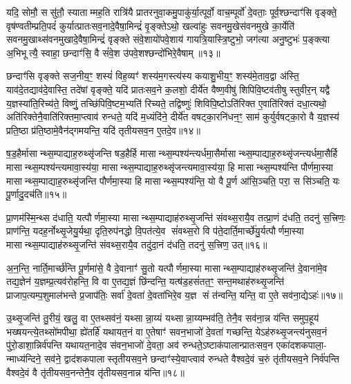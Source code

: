{\anuvakamend[{आ॒दि॒त्यस्तस्यै॒व द्वे च॑॥४॥}]}

यदि॒ सोमौ॒ ससु॑तौ॒ स्याताम्मह॒ति रात्रि॑यै प्रातरनुवा॒कमु॒पाकु॑र्या॒त्पूर्वो॒ वाच॒म्पूर्वो॑ दे॒वताः॒ पूर्व॒श्छन्दाꣳ॑सि वृङ्क्ते॒ वृष॑ण्वतीम्प्रति॒पदं॑ कुर्यात्प्रातःसव॒नादे॒वैषा॒मिन्द्रं॑ वृ॒ङ्क्तेऽथो॒ खल्वा॑हुः सवनमु॒खेस॑वनमुखे का॒र्येति॑ सवनमु॒खाथ्स॑वनमुखादे॒वैषा॒मिन्द्रं॑ वृङ्क्ते संवे॒शायो॑पवे॒शाय॑ गायत्रि॒यास्त्रि॒ष्टुभो॒ जग॑त्या अनु॒ष्टुभः॑ प॒ङ्क्त्या अ॒भिभूत्यै॒ स्वाहा॒ छन्दाꣳ॑सि॒ वै सं॑वे॒श उ॑पवे॒शश्छन्दो॑भिरे॒वैषाम्॥१३॥

छन्दाꣳ॑सि वृङ्क्ते सज॒नीय॒ꣳ॒ शस्यं॑ विह॒व्यꣳ॑ शस्य॑म॒गस्त्य॑स्य कयाशु॒भीय॒ꣳ॒ शस्य॑मे॒ताव॒द्वा अ॑स्ति॒ याव॑दे॒तद्याव॑दे॒वास्ति॒ तदे॑षां वृङ्क्ते॒ यदि॑ प्रातःसव॒ने क॒लशो॒ दीर्ये॑त वैष्ण॒वीषु॑ शिपिवि॒ष्टव॑तीषु स्तुवीर॒न् यद्वै य॒ज्ञस्या॑ति॒रिच्य॑ते॒ विष्णुं॒ तच्छि॑पिवि॒ष्टम॒भ्यति॑ रिच्यते॒ तद्विष्णुः॑ शिविपि॒ष्टोऽति॑रिक्त ए॒वाति॑रिक्तं दधा॒त्यथो॒ अति॑रिक्तेनै॒वाति॑रिक्तमा॒प्त्वाव॑ रुन्धते॒ यदि॑ म॒ध्यंदि॑ने॒ दीर्ये॑त वषट्का॒रनि॑धन॒ꣳ॒ साम॑ कुर्युर्वषट्का॒रो वै य॒ज्ञस्य॑ प्रति॒ष्ठा प्र॑ति॒ष्ठामे॒वैन॑द्गमयन्ति॒ यदि॑ तृतीयसव॒न ए॒तदे॒व॥१४॥

{\anuvakamend[{छन्दो॑भिरे॒वैषा॒मवैका॒न्नविꣳ॑श॒तिश्च॑॥५॥}]}

ष॒ड॒हैर्मासान्थ्स॒म्पाद्याह॒रुथ्सृ॑जन्ति षड॒हैर्\mbox{}हि मासान्थ्स॒म्पश्य॑न्त्यर्धमा॒सैर्मासान्थ्स॒म्पाद्याह॒रुथ्सृ॑जन्त्यर्धमा॒सैर्\mbox{}हि मासान्थ्स॒म्पश्य॑न्त्यमावा॒स्य॑या॒ मासान्थ्स॒म्पाद्याह॒रुथ्सृ॑जन्त्यमावा॒स्य॑या॒ हि मासान्थ्स॒म्पश्य॑न्ति पौर्णमा॒स्या मासान्थ्स॒म्पाद्याह॒रुथ्सृ॑जन्ति पौर्णमा॒स्या हि मासान्थ्स॒म्पश्य॑न्ति॒ यो वै पू॒र्ण आ॑सि॒ञ्चति॒ परा॒ स सि॑ञ्चति॒ यः पू॒र्णादु॒दच॑ति॥१५॥

प्रा॒णम॑स्मि॒न्थ्स द॑धाति॒ यत्पौर्णमा॒स्या मासान्थ्स॒म्पाद्याह॑रुथ्सृ॒जन्ति॑ संवथ्स॒रायै॒व तत्प्रा॒णं द॑धति॒ तदनु॑ स॒त्त्रिणः॒ प्राण॑न्ति॒ यदह॒र्नोथ्सृ॒जेयु॒र्यथा॒ दृति॒रुप॑नद्धो वि॒पत॑त्ये॒व सं॑वथ्स॒रो वि प॑ते॒दार्ति॒मार्च्छे॑यु॒र्यत्पौर्णमा॒स्या मासान्थ्स॒म्पाद्याह॑रुथ्सृ॒जन्ति॑ संवथ्स॒रायै॒व तदु॑दा॒नं द॑धति॒ तदनु॑ स॒त्त्रिण॒ उत्॥१६॥

अ॒न॒न्ति॒ नार्ति॒मार्च्छ॑न्ति पू॒र्णमा॑से॒ वै दे॒वानाꣳ॑ सु॒तो यत्पौर्णमा॒स्या मासान्थ्स॒म्पाद्याह॑रुथ्सृ॒जन्ति॑ दे॒वाना॑मे॒व तद्य॒ज्ञेन॑ य॒ज्ञम्प्र॒त्यव॑रोहन्ति॒ वि वा ए॒तद्य॒ज्ञं छि॑न्दन्ति॒ यत्ष॑ड॒हसं॑तत॒ꣳ॒ सन्त॒मथाह॑रुथ्सृ॒जन्ति॑ प्राजाप॒त्यम्प॒शुमाल॑भन्ते प्र॒जाप॑तिः॒ सर्वा॑ दे॒वता॑ दे॒वता॑भिरे॒व य॒ज्ञ सं त॑न्वन्ति॒ यन्ति॒ वा ए॒ते सव॑ना॒द्येऽहः॑॥१७॥

उ॒थ्सृ॒जन्ति॑ तु॒रीयं॒ खलु॒ वा ए॒तथ्सव॑नं॒ यथ्सान्ना॒य्यं यथ्सान्ना॒य्यम्भव॑ति॒ तेनै॒व सव॑ना॒न्न य॑न्ति समुप॒हूय॑ भख्षयन्त्ये॒तथ्सो॑मपीथा॒ ह्ये॑तर्\mbox{}हि॑ यथायत॒नं वा ए॒तेषाꣳ॑ सवन॒भाजो॑ दे॒वता॑ गच्छन्ति॒ येऽह॑रुथ्सृ॒जन्त्य॑नुसव॒नं पु॑रो॒डाशा॒न्निर्व॑पन्ति यथायत॒नादे॒व स॑वन॒भाजो॑ दे॒वता॒ अव॑ रुन्धते॒ऽष्टाक॑पालान्प्रातःसव॒न एका॑दशकपाला॒- न्माध्य॑न्दिने॒ सव॑ने॒ द्वाद॑शकपालास्तृतीयसव॒ने छन्दाꣳ॑स्ये॒वाप्त्वाव॑ रुन्धते वैश्वदे॒वं च॒रुं तृ॑तीयसव॒ने निर्व॑पन्ति वैश्वदे॒वं वै तृ॑तीयसव॒नन्तेनै॒व तृ॑तीयसव॒नान्न य॑न्ति॥१८॥


